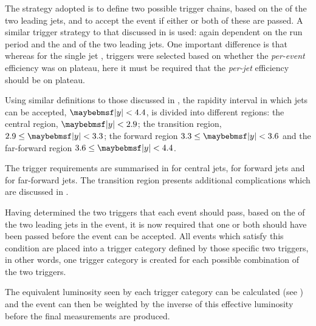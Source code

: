 The strategy adopted is to define two possible trigger chains, based
on the \pT of the two leading jets, and to accept the event if either or both of
these are passed. A similar trigger strategy to that discussed in
 is used: again dependent on the run
period and the \pT and \rap of the two leading jets. One important difference is that
whereas for the single jet \xs, triggers were selected based on whether the
\emph{per-event} efficiency was on plateau, here it must be required that the
\emph{per-jet} efficiency should be on plateau.

Using similar definitions to those discussed in ,
the rapidity interval in which jets can be accepted, $\absRap < 4.4$, is divided
into different regions: the central region, $\absRap < 2.9$; the transition region,
$2.9 \leq \absRap < 3.3$; the forward region $3.3 \leq \absRap < 3.6$ and the far-forward
region $3.6 \leq \absRap < 4.4$.

The trigger requirements are summarised in 
for central jets,  for forward jets
and  for far-forward jets. The transition
region presents additional complications which are discussed in .

Having determined the two triggers that each event should pass, based on the \pT
of the two leading jets in the event, it is now required that one or both should have been passed
before the event can be accepted. All events which satisfy this condition are placed
into a trigger category defined by those specific two triggers, in other words,
one trigger category is created for each possible combination of the two triggers.

The equivalent luminosity seen by each trigger category can be calculated (see
) and the event can then be weighted
by the inverse of this effective luminosity before the final \xs measurements are
produced.

